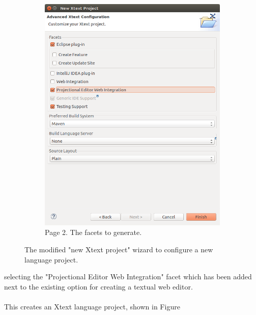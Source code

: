 \documentclass{article}
\begin{document}
\begin{figure}[t!]
\begin{subfigure}[b]{0.45\linewidth}
  \end{subfigure}
  \begin{subfigure}[b]{0.45\linewidth}
    \includegraphics[width=\linewidth]{./Screenshots/newXtextProjectPage2.png}
    \caption{Page 2. The facets to generate.}
  \end{subfigure}
  \caption{The modified "new Xtext project" wizard to configure a new language project.}
  \label{fig:newProjectWiz}
\end{figure}
selecting the "Projectional Editor Web Integration" facet which has been added next to the existing option for creating a textual web editor.
\\
\\
This creates an Xtext language project, shown in Figure
\end{document}
